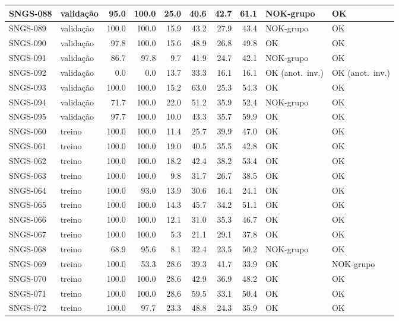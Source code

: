 \begin{small}
\begin{longtable}{|l|l|r|r|r|r|r|r|l|l|}
SNGS-088 & validação & 95.0 & 100.0 & 25.0 & 40.6 & 42.7 & 61.1 & NOK-grupo & OK \\ \hline
SNGS-089 & validação & 100.0 & 100.0 & 15.9 & 43.2 & 27.9 & 43.4 & NOK-grupo & OK \\ \hline
SNGS-090 & validação & 97.8 & 100.0 & 15.6 & 48.9 & 26.8 & 49.8 & OK & OK \\ \hline
SNGS-091 & validação & 86.7 & 97.8 & 9.7 & 41.9 & 24.7 & 42.1 & NOK-grupo & OK \\ \hline
SNGS-092 & validação & 0.0 & 0.0 & 13.7 & 33.3 & 16.1 & 16.1 & OK (anot.\ inv.) & OK (anot.\ inv.) \\ \hline
SNGS-093 & validação & 100.0 & 100.0 & 15.2 & 63.0 & 25.3 & 54.3 & OK & OK \\ \hline
SNGS-094 & validação & 71.7 & 100.0 & 22.0 & 51.2 & 35.9 & 52.4 & NOK-grupo & OK \\ \hline
SNGS-095 & validação & 97.7 & 100.0 & 10.0 & 43.3 & 35.7 & 59.9 & OK & OK \\ \hline
SNGS-060 & treino & 100.0 & 100.0 & 11.4 & 25.7 & 39.9 & 47.0 & OK & OK \\ \hline
SNGS-061 & treino & 100.0 & 100.0 & 19.0 & 40.5 & 35.5 & 42.8 & OK & OK \\ \hline
SNGS-062 & treino & 100.0 & 100.0 & 18.2 & 42.4 & 38.2 & 53.4 & OK & OK \\ \hline
SNGS-063 & treino & 100.0 & 100.0 & 9.8 & 31.7 & 26.7 & 38.5 & OK & OK \\ \hline
SNGS-064 & treino & 100.0 & 93.0 & 13.9 & 30.6 & 16.4 & 24.1 & OK & OK \\ \hline
SNGS-065 & treino & 100.0 & 100.0 & 14.3 & 45.7 & 34.2 & 51.1 & OK & OK \\ \hline
SNGS-066 & treino & 100.0 & 100.0 & 12.1 & 31.0 & 35.3 & 46.7 & OK & OK \\ \hline
SNGS-067 & treino & 100.0 & 100.0 & 5.3 & 21.1 & 29.1 & 37.8 & OK & OK \\ \hline
SNGS-068 & treino & 68.9 & 95.6 & 8.1 & 32.4 & 23.5 & 50.2 & NOK-grupo & OK \\ \hline
SNGS-069 & treino & 100.0 & 53.3 & 28.6 & 39.3 & 41.7 & 33.9 & OK & NOK-grupo \\ \hline
SNGS-070 & treino & 100.0 & 100.0 & 28.6 & 42.9 & 36.9 & 48.2 & OK & OK \\ \hline
SNGS-071 & treino & 100.0 & 100.0 & 28.6 & 59.5 & 33.1 & 50.4 & OK & OK \\ \hline
SNGS-072 & treino & 100.0 & 97.7 & 23.3 & 48.8 & 24.3 & 35.9 & OK & OK \\ \hline

\end{longtable}
\end{small}

